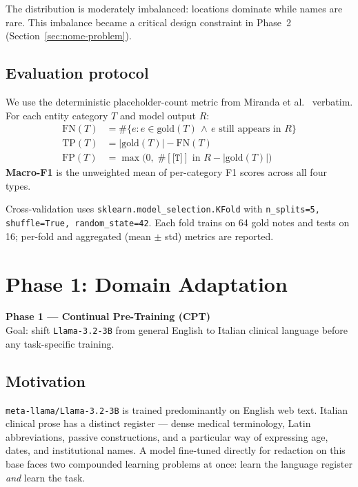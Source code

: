 \documentclass[11pt,a4paper]{article}
\newcommand{\phasetitle}[3]{%
  \vspace{1em}
  \noindent\colorbox{#1!15}{%
    \parbox{\dimexpr\linewidth-2\fboxsep}{%
      \vspace{0.4em}
      {\large\bfseries\color{#1} #2}\\[0.15em]
      {\small\color{#1!80!black} #3}
      \vspace{0.4em}
    }%
  }%
  \vspace{0.5em}
}
\begin{document}
The distribution is moderately imbalanced: locations dominate while names are rare. This imbalance became a critical design constraint in Phase~2 (Section~\ref{sec:nome-problem}).

\subsection{Evaluation protocol}

We use the deterministic placeholder-count metric from Miranda et al.\ \cite{miranda2025mamma} verbatim. For each entity category $T$ and model output $R$:
\begin{align*}
\text{FN}(T) &= \#\{e : e \in \text{gold}(T) \,\land\, e \text{ still appears in } R\} \\
\text{TP}(T) &= |\text{gold}(T)| - \text{FN}(T) \\
\text{FP}(T) &= \max\bigl(0,\; \#[\texttt{[T]}] \text{ in } R - |\text{gold}(T)|\bigr)
\end{align*}
\textbf{Macro-F1} is the unweighted mean of per-category F1 scores across all four types.

Cross-validation uses \texttt{sklearn.model\_selection.KFold} with \texttt{n\_splits=5, shuffle=True, random\_state=42}. Each fold trains on 64 gold notes and tests on 16; per-fold and aggregated (mean $\pm$ std) metrics are reported.

\section{Phase 1: Domain Adaptation}
\label{sec:phase1}

\phasetitle{phase1color}{Phase 1 — Continual Pre-Training (CPT)}{Goal: shift \texttt{Llama-3.2-3B} from general English to Italian clinical language before any task-specific training.}

\subsection{Motivation}

\texttt{meta-llama/Llama-3.2-3B} is trained predominantly on English web text. Italian clinical prose has a distinct register — dense medical terminology, Latin abbreviations, passive constructions, and a particular way of expressing age, dates, and institutional names. A model fine-tuned directly for redaction on this base faces two compounded learning problems at once: learn the language register \textit{and} learn the task.
\end{document}
